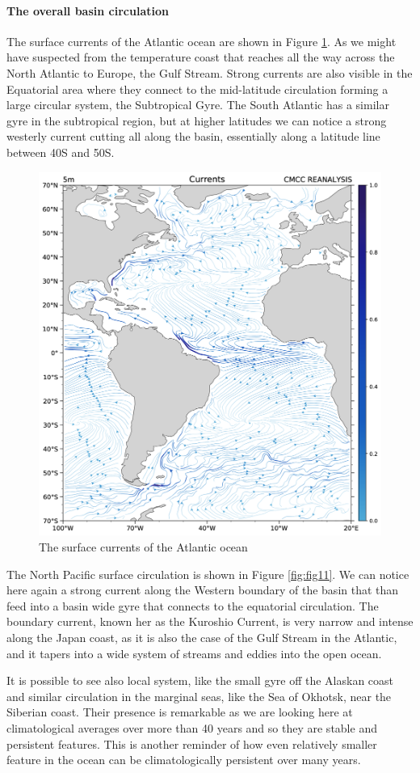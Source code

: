 \paragraph{The overall basin
	circulation}\label{the-overall-basin-circulation}

The surface currents of the Atlantic ocean are shown in Figure \ref{fig:fig10}. As we might have suspected from the temperature coast that reaches all the way across the North Atlantic to Europe, the Gulf Stream. Strong currents are also visible in the Equatorial area
where they connect to the mid-latitude circulation forming a large circular system, the Subtropical Gyre. The South Atlantic has a similar gyre in the subtropical region, but at higher latitudes we can notice a strong westerly current cutting all along the basin, essentially along a latitude line between 40S and 50S.

\begin{figure}[htpb]
	\centering
	\includegraphics[width = 0.4 \textwidth]{uploads/35image.png}
	\caption{The surface currents of the Atlantic ocean} \label{fig:fig10}
\end{figure}

The North Pacific surface circulation is shown in Figure \ref{fig:fig11}. We can notice here again a strong current along the Western boundary of the basin that than feed into a basin wide gyre that connects to the equatorial circulation. The boundary current, known her as the Kuroshio Current, is very narrow and intense along the Japan coast, as it is also the case of the Gulf Stream in the Atlantic, and it tapers into a wide system of streams and eddies into the open ocean.

It is possible to see also local system, like the small gyre off the Alaskan coast and similar circulation in the marginal seas, like the Sea of Okhotsk, near the Siberian coast. Their presence is remarkable as we are looking here at climatological averages over more than 40 years and so they are stable and persistent features. This is another reminder of how even relatively smaller feature in the ocean can be climatologically persistent over many years.

